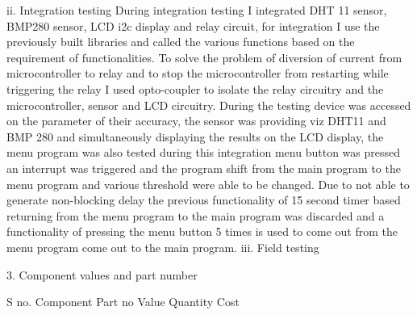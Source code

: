 ii. Integration testing During integration testing I integrated DHT 11 sensor, BMP280 sensor, LCD i2c display and relay circuit, for integration I use the previously built libraries and called the various functions based on the requirement of functionalities. To solve the problem of diversion of current from microcontroller to relay and to stop the microcontroller from restarting while triggering the relay I used opto-\/coupler to isolate the relay circuitry and the microcontroller, sensor and LCD circuitry. During the testing device was accessed on the parameter of their accuracy, the sensor was providing viz DHT11 and BMP 280 and simultaneously displaying the results on the LCD display, the menu program was also tested during this integration menu button was pressed an interrupt was triggered and the program shift from the main program to the menu program and various threshold were able to be changed. Due to not able to generate non-\/blocking delay the previous functionality of 15 second timer based returning from the menu program to the main program was discarded and a functionality of pressing the menu button 5 times is used to come out from the menu program come out to the main program. iii. Field testing \begin{DoxyVerb}3. Component values and part number 
\end{DoxyVerb}
 S no. Component Part no Value Quantity Cost
